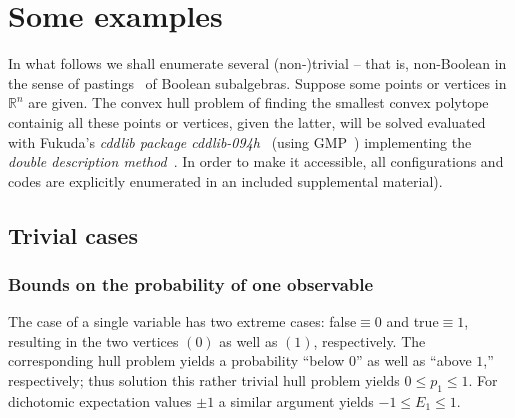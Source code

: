 \documentclass[%
  twocolumn,
 showpacs,
 showkeys,
 preprintnumbers,
 amsmath,amssymb,
 aps,
  pra,
  longbibliography,
 floatfix,
 ]{revtex4-1}
\begin{document}
\section{Some examples}
\label{2017-b-se}

In what follows we shall enumerate several (non-)trivial -- that is, non-Boolean in the sense of pastings~\cite{greechie:71,kalmbach-83,nav:91,pulmannova-91}
of Boolean subalgebras. Suppose some points or vertices in $\mathbb{R}^n$ are given.
The convex hull problem
of finding the smallest convex polytope containig all these points or vertices, given the latter,
will be solved evaluated with Fukuda's {\em cddlib package cddlib-094h}~\cite{cdd-pck} (using GMP~\cite{gmplib})
implementing the {\em double description method}~\cite{FP96,Avis:1997:GCH:280651.280652,Avis-2002}.
In order to make it accessible, all configurations and codes are explicitly enumerated in an included supplemental material).

\subsection{Trivial cases}
\label{2017-b-trivc}



\subsubsection{Bounds on the probability of one observable}

The case of a single variable has two extreme cases: false$\equiv 0$ and true$\equiv 1$,
resulting in the two vertices $\left( 0\right)$
as well as $\left( 1\right)$, respectively. The corresponding hull problem yields a probability ``below $0$'' as well as ``above $1$,''
respectively; thus solution this rather trivial hull problem yields
$0\le p_1 \le 1$.  For dichotomic expectation values $\pm 1$   a similar argument yields   $-1\le E_1 \le 1$.
\end{document}
